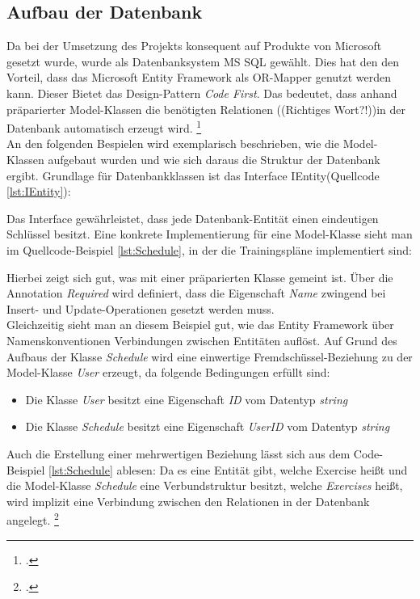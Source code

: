 \subsection{Aufbau der Datenbank}
\label{ssec:aufbau-server-db}
Da bei der Umsetzung des Projekts konsequent auf Produkte von Microsoft gesetzt wurde, wurde als Datenbanksystem MS SQL gewählt. Dies hat den den Vorteil, dass das \ac{Microsoft Entity Framework} als \ac{OR-Mapper} genutzt werden kann. Dieser Bietet das Design-Pattern \textit{Code First}. Das bedeutet, dass anhand präparierter Model-Klassen die benötigten Relationen ((Richtiges Wort?!))in der Datenbank automatisch erzeugt wird. \footcite{entity-framework-code-first}\\
An den folgenden Bespielen wird exemplarisch beschrieben, wie die Model-Klassen aufgebaut wurden und wie sich daraus die Struktur der Datenbank ergibt. Grundlage für Datenbankklassen ist das Interface IEntity(Quellcode \ref{lst:IEntity}):

Das Interface gewährleistet, dass jede Datenbank-Entität einen eindeutigen Schlüssel besitzt.
Eine konkrete Implementierung für eine Model-Klasse sieht man im Quellcode-Beispiel \ref{lst:Schedule}, in der die Trainingspläne implementiert sind:

Hierbei zeigt sich gut, was mit einer präparierten Klasse gemeint ist. Über die Annotation \textit{Required} wird definiert, dass die Eigenschaft \textit{Name} zwingend bei Insert- und Update-Operationen gesetzt werden muss. \\
Gleichzeitig sieht man an diesem Beispiel gut, wie das Entity Framework über Namenskonventionen Verbindungen zwischen Entitäten auflöst. Auf Grund des Aufbaus der Klasse \textit{Schedule} wird eine \ac{einwertige Fremdschüssel}-Beziehung zu der Model-Klasse \textit{User} erzeugt, da folgende Bedingungen erfüllt sind:
\begin{itemize}
\item Die Klasse \textit{User} besitzt eine Eigenschaft \textit{ID} vom Datentyp \textit{string}
\item Die Klasse \textit{Schedule} besitzt eine Eigenschaft \textit{UserID} vom Datentyp \textit{string}
\end{itemize}
Auch die Erstellung einer \ac{mehrwertigen} Beziehung lässt sich aus dem Code-Beispiel \ref{lst:Schedule} ablesen: Da es eine Entität gibt, welche Exercise heißt und die Model-Klasse \textit{Schedule} eine Verbundstruktur besitzt, welche \textit{Exercises} heißt, wird implizit eine Verbindung zwischen den Relationen in der Datenbank angelegt. \footcite{entity-framework-code-first}
